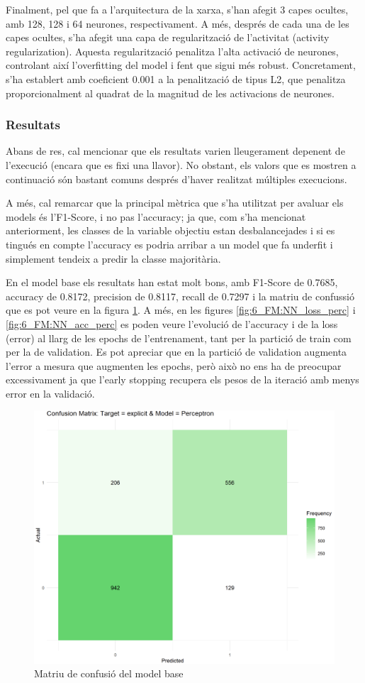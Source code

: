 Finalment, pel que fa a l'arquitectura de la xarxa, s'han afegit 3 capes ocultes, amb 128, 128 i 64 neurones, respectivament. A més, després de cada una de les capes ocultes, s'ha afegit una capa de regularització de l'activitat (activity regularization). Aquesta regularització penalitza l'alta activació de neurones, controlant així l'overfitting del model i fent que sigui més robust. Concretament, s'ha establert amb coeficient 0.001 a la penalització de tipus L2, que penalitza proporcionalment al quadrat de la magnitud de les activacions de neurones.

\subsubsection{Resultats}
Abans de res, cal mencionar que els resultats varien lleugerament depenent de l'execució (encara que es fixi una llavor). No obstant, els valors que es mostren a continuació són bastant comuns després d'haver realitzat múltiples execucions.

A més, cal remarcar que la principal mètrica que s'ha utilitzat per avaluar els models és l'F1-Score, i no pas l'accuracy; ja que, com s'ha mencionat anteriorment, les classes de la variable objectiu estan desbalancejades i si es tingués en compte l'accuracy es podria arribar a un model que fa underfit i simplement tendeix a predir la classe majoritària.

En el model base els resultats han estat molt bons, amb F1-Score de 0.7685, accuracy de 0.8172,  precision de 0.8117, recall de 0.7297 i la matriu de confussió que es pot veure en la figura \ref{fig:6_FM:NN_cm_perc}. A més, en les figures \ref{fig:6_FM:NN_loss_perc} i \ref{fig:6_FM:NN_acc_perc} es poden veure l'evolució de l'accuracy i de la loss (error) al llarg de les epochs de l'entrenament, tant per la partició de train com per la de validation. Es pot apreciar que en la partició de validation augmenta l'error a mesura que augmenten les epochs, però això no ens ha de preocupar excessivament ja que l'early stopping recupera els pesos de la iteració amb menys error en la validació.

\begin{figure}[H]
    \centering
    \includegraphics[width=0.8\linewidth]{Images/6_Factorial_Methods/NN/cm_perc.png}
    \caption{Matriu de confusió del model base}
    \label{fig:6_FM:NN_cm_perc}
\end{figure}

